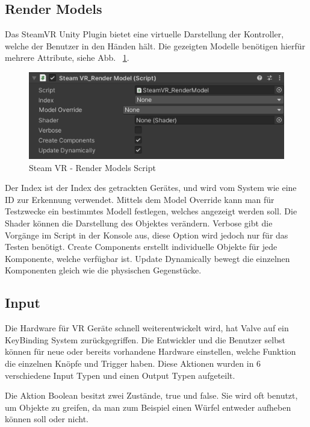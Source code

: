 \subsection{Render Models}\label{subsec:render-models}
Das SteamVR Unity Plugin bietet eine virtuelle Darstellung der Kontroller, welche der Benutzer in den Händen hält.
Die gezeigten Modelle benötigen hierfür mehrere Attribute, siehe Abb. ~\ref{fig:steamvr_render_models Script}.
\begin {figure}
    \centering
    \includegraphics[scale=1]{pics/steamVR_render_models_script}
    \caption{Steam VR - Render Models Script}
    \label{fig:steamvr_render_models Script}
\end {figure}
Der Index ist der Index des getrackten Gerätes, und wird vom System wie eine ID zur Erkennung verwendet.
Mittels dem Model Override kann man für Testzwecke ein bestimmtes Modell festlegen, welches angezeigt werden soll.
Die Shader können die Darstellung des Objektes verändern.
Verbose gibt die Vorgänge im Script in der Konsole aus, diese Option wird jedoch nur für das Testen benötigt.
Create Components erstellt individuelle Objekte für jede Komponente, welche verfügbar ist.
Update Dynamically bewegt die einzelnen Komponenten gleich wie die physischen Gegenstücke.
~\cite{SteamVR_Render_Models_2022}

\subsection{Input}\label{subsec:input}
Die Hardware für VR Geräte schnell weiterentwickelt wird, hat Valve auf ein KeyBinding System zurückgegriffen.
Die Entwickler und die Benutzer selbst können für neue oder bereits vorhandene Hardware einstellen, welche Funktion die einzelnen Knöpfe und Trigger haben.
Diese Aktionen wurden in 6 verschiedene Input Typen und einen Output Typen aufgeteilt.

Die Aktion Boolean besitzt zwei Zustände, true und false.
Sie wird oft benutzt, um Objekte zu greifen, da man zum Beispiel einen Würfel entweder aufheben können soll oder nicht.

